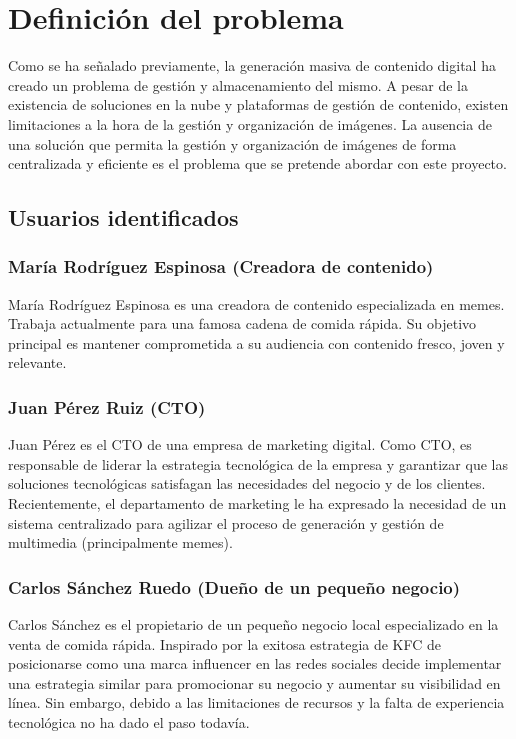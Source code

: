 \section{Definición del problema}

Como se ha señalado previamente, la generación masiva de contenido digital ha creado un problema de gestión y almacenamiento del mismo. A pesar de la existencia de
soluciones en la nube y plataformas de gestión de contenido, existen limitaciones a la hora de la gestión y organización de imágenes. La ausencia de una solución que
permita la gestión y organización de imágenes de forma centralizada y eficiente es el problema que se pretende abordar con este proyecto.

\subsection{Usuarios identificados}

    \subsubsection{María Rodríguez Espinosa (Creadora de contenido)}

    María Rodríguez Espinosa es una creadora de contenido especializada en memes. Trabaja actualmente para una famosa cadena de comida rápida. Su objetivo principal es mantener comprometida a su audiencia con contenido fresco, joven y relevante.

    \subsubsection{Juan Pérez Ruiz (CTO)}

    Juan Pérez es el CTO de una empresa de marketing digital. Como CTO, es responsable de liderar la estrategia tecnológica de la empresa y garantizar que las soluciones tecnológicas satisfagan las necesidades del negocio y de los clientes. Recientemente, el departamento de marketing le ha expresado la necesidad de un sistema centralizado para agilizar el proceso de generación y gestión de multimedia (principalmente memes).

    \subsubsection{Carlos Sánchez Ruedo (Dueño de un pequeño negocio)}

    Carlos Sánchez es el propietario de un pequeño negocio local especializado en la venta de comida rápida. Inspirado por la exitosa estrategia de KFC de posicionarse como una marca influencer en las redes sociales decide implementar una estrategia similar para promocionar su negocio y aumentar su visibilidad en línea. Sin embargo, debido a las limitaciones de recursos y la falta de experiencia tecnológica no ha dado el paso todavía.

